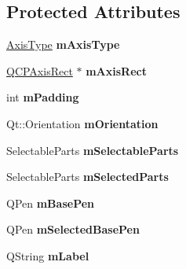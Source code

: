 \subsection*{Protected Attributes}
\begin{DoxyCompactItemize}
\item 
\hyperlink{class_q_c_p_axis_ae2bcc1728b382f10f064612b368bc18a}{Axis\+Type} {\bfseries m\+Axis\+Type}\hypertarget{class_q_c_p_axis_ae704bf9f2c2b026f08dd4ccad79c616e}{}\label{class_q_c_p_axis_ae704bf9f2c2b026f08dd4ccad79c616e}

\item 
\hyperlink{class_q_c_p_axis_rect}{Q\+C\+P\+Axis\+Rect} $\ast$ {\bfseries m\+Axis\+Rect}\hypertarget{class_q_c_p_axis_a7a427f45158d9d4dbac63af4da10f8a5}{}\label{class_q_c_p_axis_a7a427f45158d9d4dbac63af4da10f8a5}

\item 
int {\bfseries m\+Padding}\hypertarget{class_q_c_p_axis_a52a805a4f03231210e0880db7f77e098}{}\label{class_q_c_p_axis_a52a805a4f03231210e0880db7f77e098}

\item 
Qt\+::\+Orientation {\bfseries m\+Orientation}\hypertarget{class_q_c_p_axis_a048e1792fa86f4f86df55200b3f0be36}{}\label{class_q_c_p_axis_a048e1792fa86f4f86df55200b3f0be36}

\item 
Selectable\+Parts {\bfseries m\+Selectable\+Parts}\hypertarget{class_q_c_p_axis_ab9042d8a095998f27a28b39411d8b9c3}{}\label{class_q_c_p_axis_ab9042d8a095998f27a28b39411d8b9c3}

\item 
Selectable\+Parts {\bfseries m\+Selected\+Parts}\hypertarget{class_q_c_p_axis_a8f1eb0abfe2ae64652aa46b360e841e4}{}\label{class_q_c_p_axis_a8f1eb0abfe2ae64652aa46b360e841e4}

\item 
Q\+Pen {\bfseries m\+Base\+Pen}\hypertarget{class_q_c_p_axis_ad6b4a0aee9558fb35529e960b8fef72d}{}\label{class_q_c_p_axis_ad6b4a0aee9558fb35529e960b8fef72d}

\item 
Q\+Pen {\bfseries m\+Selected\+Base\+Pen}\hypertarget{class_q_c_p_axis_a80baa4e3c16f9b6edf3eccacd2a50fde}{}\label{class_q_c_p_axis_a80baa4e3c16f9b6edf3eccacd2a50fde}

\item 
Q\+String {\bfseries m\+Label}\hypertarget{class_q_c_p_axis_ae8001dbdfc47685c1cf7b98b044460e6}{}\label{class_q_c_p_axis_ae8001dbdfc47685c1cf7b98b044460e6}


\end{DoxyCompactItemize}
